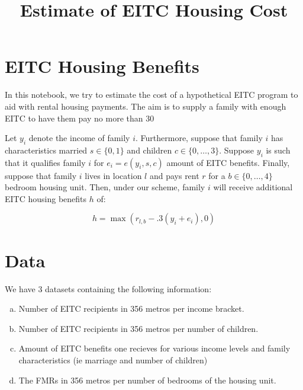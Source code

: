 \documentclass[11pt,a4paper]{article}
\title{Estimate of EITC Housing Cost}
\begin{document}
	\maketitle
	\section{EITC Housing Benefits }
	In this notebook, we try to estimate the cost of a hypothetical EITC program to aid with rental housing payments. The aim is to supply a family with enough EITC to have them pay no more than 30%
	
	Let $y_i$ denote the income of family $i$. Furthermore, suppose that family $i$ has characteristics married $s \in \{0,1\}$ and children $c \in \{0,\dots, 3\}$. Suppose $y_i$ is such that it qualifies family $i$ for $e_i = e(y_i,s,c)$ amount of EITC benefits. Finally, suppose that family $i$ lives in location $l$ and pays rent $r$ for a $b\in \{0,\dots,4\}$ bedroom housing unit. Then, under our scheme, family $i$ will receive additional EITC housing benefits $h$ of:
	
	$$h = \max(r_{l,b} - .3(y_i+e_i), 0 )$$
	
	\section {Data}
	We have 3 datasets containing the following information:
	
	\begin{enumerate}[a.]
	\item  Number of EITC recipients in 356 metros per income bracket. 
	\item Number of EITC recipients in 356 metros per number of children.
	\item Amount of EITC benefits one recieves for various income levels and family characteristics (ie marriage and number of children)
	\item The FMRs in 356 metros per number of bedrooms of the housing unit.
	\end{enumerate}
	
\end{document}

